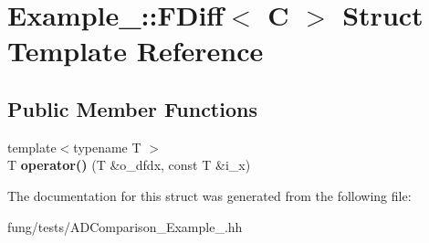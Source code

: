 \hypertarget{structExample__2_1_1FDiff}{\section{Example\-\_\-:\-:F\-Diff$<$ C $>$ Struct Template Reference}
\label{structExample__2_1_1FDiff}
}
\subsection*{Public Member Functions}
\begin{DoxyCompactItemize}
\item 
\hypertarget{structExample__2_1_1FDiff_a9399c3f33cdd14a9f65795921f632888}{{\footnotesize template$<$typename T $>$ }\\T {\bfseries operator()} (T \&o\-\_\-dfdx, const T \&i\-\_\-x)}\label{structExample__2_1_1FDiff_a9399c3f33cdd14a9f65795921f632888}

\end{DoxyCompactItemize}


The documentation for this struct was generated from the following file\-:\begin{DoxyCompactItemize}
\item 
fung/tests/A\-D\-Comparison\-\_\-\-Example\-\_.\-hh\end{DoxyCompactItemize}
